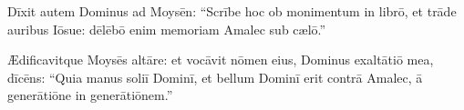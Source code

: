Dīxit autem
Dominus ad Moysēn: ``Scrībe hoc ob monimentum in librō, et trāde auribus Iōsue: dēlēbō enim memoriam
Amalec sub cælō.'' 

Ædificavitque Moysēs altāre: et vocāvit nōmen eius,
Dominus exaltātiō mea, dīcēns: 
``Quia manus soliī Dominī,
et bellum Dominī erit contrā Amalec, ā generātiōne in generātiōnem.''
